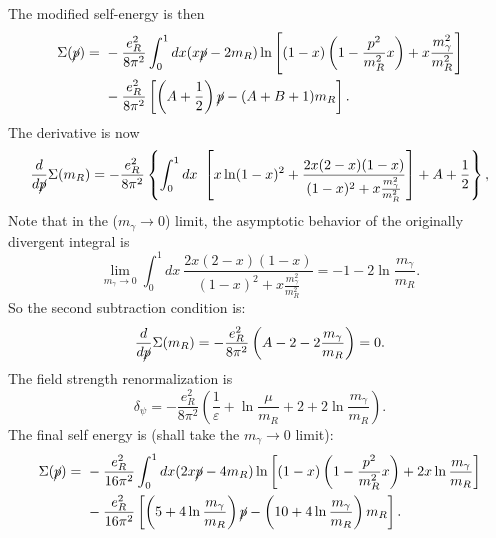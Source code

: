 \documentclass[aps,prb,superscriptaddress,nofootinbib]{revtex4}
\begin{document}
The modified self-energy is then
\begin{equation}
\begin{aligned}
	\Sigma(\cancel p)
	=&\ -\frac{e_R^2}{8\pi^2} \int_0^1 dx(x\cancel{p}-2m_R)\ln\left[(1-x)\left(1- \frac{p^2}{m_R^2} x \right) + x \frac{m_\gamma^2}{m_R^2} \right]\\
	&\  -\frac{e_R^2}{8\pi^2} \left[\left(A+\frac{1}{2}\right)\cancel p - (A+B+1)m_R\right].
\end{aligned}
\end{equation}
The derivative is now
\begin{equation}
	\frac{d}{d \cancel p}\Sigma(m_R)  
	= -\frac{e_R^2}{8\pi^2} \left\{ \int_0^1 dx\ \left[ x\ln(1-x)^2 +\frac{2x(2-x)(1-x)}{(1-x)^2 + x \frac{m_\gamma^2}{m_R^2}} \right] + A + \frac{1}{2}\right\},
\end{equation}
Note that in the ($m_\gamma \rightarrow 0$) limit, the asymptotic behavior of the originally divergent integral is
\begin{equation}
	\lim_{m_\gamma \rightarrow 0} \int_0^1 dx\ \frac{2x(2-x)(1-x)}{(1-x)^2 + x \frac{m_\gamma^2}{m_R^2}}
	= -1 - 2\ln \frac{m_\gamma}{m_R}.
\end{equation}
So the second subtraction condition is:
\begin{equation}
	\frac{d}{d \cancel p}\Sigma(m_R)  
	= -\frac{e_R^2}{8\pi^2} \left(A -2 - 2\frac{m_\gamma}{m_R} \right) = 0.
\end{equation}
The field strength renormalization is
\begin{equation}
	\delta_\psi = -\frac{e_R^2}{8\pi^2}\left(\frac{1}{\varepsilon}+\ln\frac{\mu}{m_R} +2+2\ln\frac{m_\gamma}{m_R}\right).
\end{equation}
The final self energy is (shall take the $m_\gamma \rightarrow 0$ limit):
\begin{equation}
\begin{aligned}
	\Sigma(\cancel p)
	=&\ -\frac{e_R^2}{16\pi^2} \int_0^1 dx(2x\cancel{p}-4m_R)\ln\left[(1-x)\left(1- \frac{p^2}{m_R^2} x \right) + 2x \ln\frac{m_\gamma}{m_R} \right]\\
	&\  -\frac{e_R^2}{16\pi^2} \left[\left(5+4\ln\frac{m_\gamma}{m_R}\right)\cancel p - \left(10 +4\ln\frac{m_\gamma}{m_R}\right)m_R\right].
\end{aligned}
\end{equation}
\end{document}
